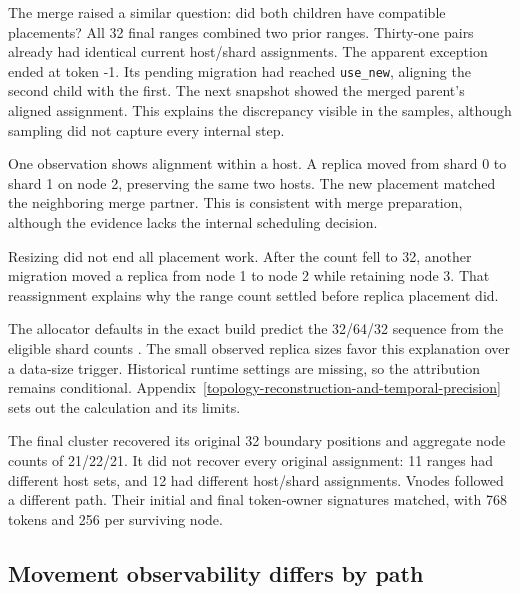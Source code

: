 The merge raised a similar question: did both children have compatible placements? All 32 final ranges combined two prior ranges. Thirty-one pairs already had identical current host/shard assignments. The apparent exception ended at token -1. Its pending migration had reached \texttt{use\_new}, aligning the second child with the first. The next snapshot showed the merged parent's aligned assignment. This explains the discrepancy visible in the samples, although sampling did not capture every internal step.

One observation shows alignment within a host. A replica moved from shard 0 to shard 1 on node 2, preserving the same two hosts. The new placement matched the neighboring merge partner. This is consistent with merge preparation, although the evidence lacks the internal scheduling decision.

Resizing did not end all placement work. After the count fell to 32, another migration moved a replica from node 1 to node 2 while retaining node 3. That reassignment explains why the range count settled before replica placement did.

The allocator defaults in the exact build predict the 32/64/32 sequence from the eligible shard counts \cite{r22}. The small observed replica sizes favor this explanation over a data-size trigger. Historical runtime settings are missing, so the attribution remains conditional. Appendix~\ref{topology-reconstruction-and-temporal-precision} sets out the calculation and its limits.

The final cluster recovered its original 32 boundary positions and aggregate node counts of 21/22/21. It did not recover every original assignment: 11 ranges had different host sets, and 12 had different host/shard assignments. Vnodes followed a different path. Their initial and final token-owner signatures matched, with 768 tokens and 256 per surviving node.

\newpage

\hypertarget{movement-observability-differs-by-path}{%
\subsection{Movement observability differs by
path}\label{movement-observability-differs-by-path}}

